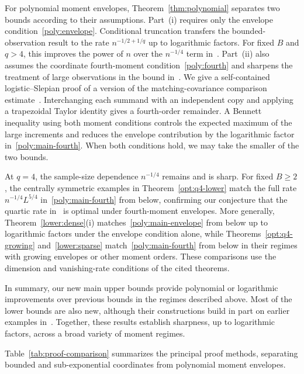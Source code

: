 \documentclass[11pt,letterpaper]{article}
\theoremstyle{remark}
\begin{document}
{For polynomial moment envelopes,
Theorem~\ref{thm:polynomial} separates two bounds according to their
assumptions. Part~\textup{(i)} requires only the envelope
condition~\eqref{poly:envelope}. Conditional truncation transfers the
bounded-observation result to the rate \(n^{-1/2+1/q}\) up to
logarithmic factors. For fixed \(B\) and \(q>4\), this improves the
power of \(n\) over the \(n^{-1/4}\) term
in~\cite[Theorem~2.5]{CCKK2022}. Part~\textup{(ii)} also assumes the
coordinate fourth-moment condition~\eqref{poly:fourth} and sharpens
 the treatment of large observations in the bound in~\cite{CCKK2022}.
We give a self-contained logistic--Slepian proof of a version of the
matching-covariance comparison estimate~\cite[Lemma~A.1]{CCKK2022}. Interchanging each
summand with an independent copy and applying a trapezoidal Taylor
identity gives a fourth-order remainder. A Bennett inequality using
both moment conditions controls the expected maximum of the large
increments and reduces the envelope contribution by the logarithmic
factor in~\eqref{poly:main-fourth}. When both conditions hold, we may
take the smaller of the two bounds.}

{At \(q=4\), the sample-size dependence
\(n^{-1/4}\) remains and is sharp. For fixed \(B\ge2\), the centrally
symmetric examples in Theorem~\ref{opt:q4-lower} match the full rate
\(n^{-1/4}L^{5/4}\) in~\eqref{poly:main-fourth} from below,
confirming our conjecture that the quartic rate
in~\cite[Theorem~2.5]{CCKK2022} is optimal under fourth-moment
envelopes. More generally, Theorem~\ref{lower:dense}\textup{(i)}
matches~\eqref{poly:main-envelope} from below up to logarithmic
factors under the envelope condition alone, while
Theorems~\ref{opt:q4-growing} and~\ref{lower:sparse}
match~\eqref{poly:main-fourth} from below in their regimes with
growing envelopes or other moment orders. These comparisons use the
dimension and vanishing-rate conditions of the cited theorems.}

{In summary, our new main upper bounds provide
polynomial or logarithmic improvements over previous bounds in the
regimes described above. Most of the lower bounds are also new,
although their constructions build in part on earlier examples
in~\cite{CCK,FKLZ}. Together, these results establish sharpness,
up to logarithmic factors, across a broad variety of moment regimes.}

{Table~\ref{tab:proof-comparison} summarizes
the principal proof methods, separating bounded and sub-exponential
coordinates from polynomial moment envelopes.}
\end{document}
